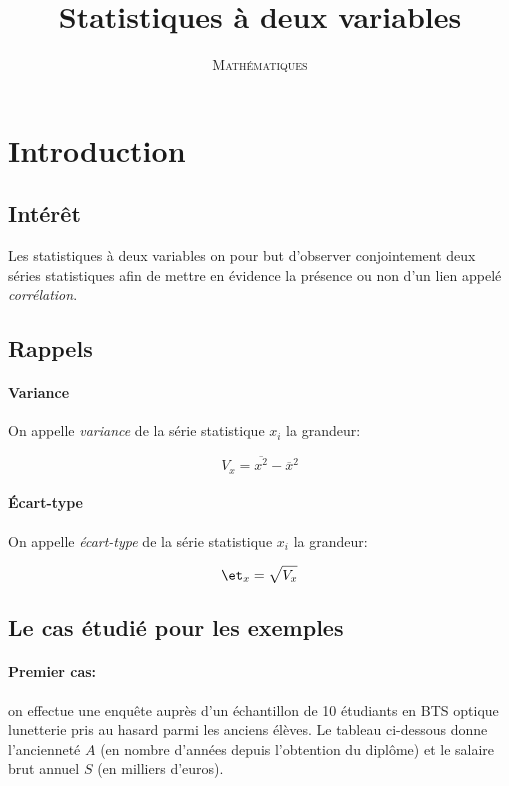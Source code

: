 \documentclass[a4paper,12pt]{scrartcl}
\date{}
\title{Statistiques à deux variables \writenoteword{}}
\author{\textsc{Mathématiques}}
\begin{document}
\maketitle

\tableofcontents

\section{Introduction}

\subsection{Intérêt}

Les statistiques à deux variables on pour but d'observer conjointement deux séries statistiques afin de mettre en évidence la présence ou non d'un lien appelé \emph{corrélation}.

\subsection{Rappels}

\paragraph{Variance}
On appelle \emph{variance} de la série statistique $x_i$ la grandeur:

\begin{equation}
V_x = \overline{x^2} - \overline{x}^2
\label{eq:variance}
\end{equation}

\paragraph{Écart-type}
On appelle \emph{écart-type} de la série statistique $x_i$ la grandeur:

\begin{equation}
\et_x = \sqrt{V_x}
\label{eq:ecarttype}
\end{equation}

\subsection{Le cas étudié pour les exemples}

\paragraph{Premier cas:}
on effectue une enquête auprès d'un échantillon de 10 étudiants en BTS optique lunetterie pris au hasard parmi les anciens élèves. Le tableau ci-dessous donne l'ancienneté $A$ (en nombre d'années depuis l'obtention du diplôme) et le salaire brut annuel $S$ (en milliers d'euros).
\end{document}
